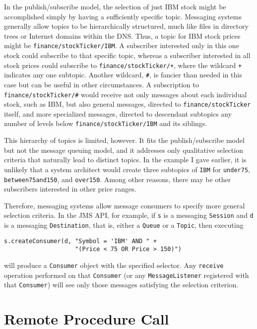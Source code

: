 In the publish/subscribe model, the selection of just IBM stock might
be accomplished simply by having a sufficiently specific topic.
Messaging systems generally allow topics to be hierarchically
structured, much like files in directory trees or Internet domains
within the DNS.  Thus, a topic for IBM stock prices might be
\verb|finance/stockTicker/IBM|.  A subscriber interested only in this
one stock could subscribe to that specific topic, whereas a subscriber
interested in all stock prices could subscribe to
\verb|finance/stockTicker/+|, where the wildcard \verb|+| indicates
any one subtopic.  Another wildcard, \verb|#|, is fancier than needed
in this case but can be useful in other circumstances.  A
subscription to \verb|finance/stockTicker/#| would receive not only
messages about each individual stock, such as IBM, but also general
messages, directed to \verb|finance/stockTicker| itself, and more
specialized messages, directed to descendant subtopics any number of
levels below \verb|finance/stockTicker/IBM| and its siblings.

This hierarchy of topics is limited, however.  It fits the
publish/subscribe model but not the message queuing  model, and
it addresses only
qualitative selection criteria that naturally lead to distinct
topics.  In the example I gave earlier, it is unlikely that a system
architect would create three subtopics of \verb|IBM| for
\verb|under75|, \verb|between75and150|, and \verb|over150|.  Among
other reasons, there may be other subscribers interested in other price
ranges.

Therefore, messaging systems allow message consumers to specify more general selection
criteria.  In the JMS API,  for example, if \verb|s| is a messaging
\verb|Session| and \verb|d| is a messaging \verb|Destination|, that
is, either a \verb|Queue| or a \verb|Topic|, then executing
\begin{verbatim}
s.createConsumer(d, "Symbol = 'IBM' AND " +
                    "(Price < 75 OR Price > 150)")
\end{verbatim}
will produce a \verb|Consumer| object with the specified selector.
Any \verb|receive| operation performed on that \verb|Consumer| (or any
\verb|MessageListener| registered with that \verb|Consumer|) will see
only those messages satisfying the selection criterion.

\section{Remote Procedure Call}\label{RPC-section}

